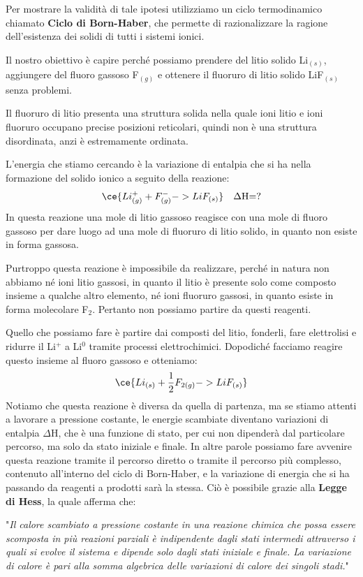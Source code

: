 Per mostrare la validità di tale ipotesi utilizziamo un ciclo termodinamico chiamato \textbf{Ciclo di Born-Haber}, che permette di razionalizzare la ragione dell'esistenza dei solidi di tutti i sistemi ionici.

Il nostro obiettivo è capire perché possiamo prendere del litio solido Li$_{(s)}$, aggiungere del fluoro gassoso F$_{(g)}$ e ottenere il fluoruro di litio solido LiF$_{(s)}$ senza problemi.

Il fluoruro di litio presenta una struttura solida nella quale ioni litio e ioni fluoruro occupano precise posizioni reticolari, quindi non è una struttura disordinata, anzi è estremamente ordinata.

L'energia che stiamo cercando è la variazione di entalpia che si ha nella formazione del solido ionico a seguito della reazione:
$$\ce{Li^{+}_{(g)} + F^{-}_{(g)} -> LiF_{(s)}} \quad \Delta\text{H=?}$$
In questa reazione una mole di litio gassoso reagisce con una mole di fluoro gassoso per dare luogo ad una mole di fluoruro di litio solido, in quanto non esiste in forma gassosa.

Purtroppo questa reazione è impossibile da realizzare, perché in natura non abbiamo né ioni litio gassosi, in quanto il litio è presente solo come composto insieme a qualche altro elemento, né ioni fluoruro gassosi, in quanto esiste in forma molecolare F$_2$. Pertanto non possiamo partire da questi reagenti.

Quello che possiamo fare è partire dai composti del litio, fonderli, fare elettrolisi e ridurre il Li$^+$ a Li$^0$ tramite processi elettrochimici. Dopodiché facciamo reagire questo insieme al fluoro gassoso e otteniamo:
$$\ce{Li_{(s)} + \frac{1}{2}F_{2(g)} -> LiF_{(s)}}$$
Notiamo che questa reazione è diversa da quella di partenza, ma se stiamo attenti a lavorare a pressione costante, le energie scambiate diventano variazioni di entalpia $\Delta$H, che è una funzione di stato, per cui non dipenderà dal particolare percorso, ma solo da stato iniziale e finale. In altre parole possiamo fare avvenire questa reazione tramite il percorso diretto o tramite il percorso più complesso, contenuto all'interno del ciclo di Born-Haber, e la variazione di energia che si ha passando da reagenti a prodotti sarà la stessa. Ciò è possibile grazie alla \textbf{Legge di Hess}, la quale afferma che:

\vspace{0.2cm}"\textit{Il calore scambiato a pressione costante in una reazione chimica che possa essere scomposta in più reazioni parziali è indipendente dagli stati intermedi attraverso i quali si evolve il sistema e dipende solo dagli stati iniziale e finale. La variazione di calore è pari alla somma algebrica delle variazioni di calore dei singoli stadi.}"

